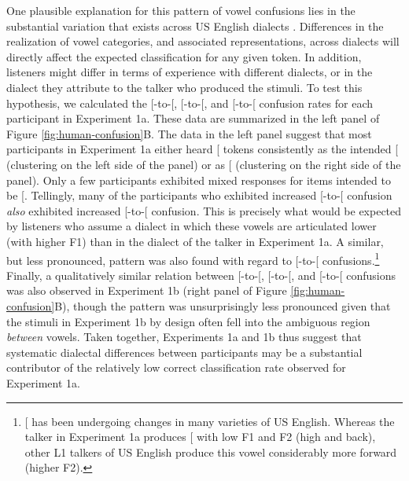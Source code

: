 \documentclass[preprint]{JASA}
\begin{document}
One plausible explanation for this pattern of vowel confusions lies in the substantial variation that exists across US English dialects \citep{atlasnae}. Differences in the realization of vowel categories, and associated representations, across dialects will directly affect the expected classification for any given token. In addition, listeners might differ in terms of experience with different dialects, or in the dialect they attribute to the talker who produced the stimuli. To test this hypothesis, we calculated the {[}\ipatext{ɪ}{]}-to-{[}\ipatext{ɛ}{]}, {[}\ipatext{ɛ}{]}-to-{[}\ipatext{æ}{]}, and {[}\ipatext{u}{]}-to-{[}\ipatext{ʊ}{]} confusion rates for each participant in Experiment 1a. These data are summarized in the left panel of Figure \ref{fig:human-confusion}B. The data in the left panel suggest that most participants in Experiment 1a either heard {[}\ipatext{ɪ}{]} tokens consistently as the intended {[}\ipatext{ɪ}{]} (clustering on the left side of the panel) or as {[}\ipatext{ɛ}{]} (clustering on the right side of the panel). Only a few participants exhibited mixed responses for items intended to be {[}\ipatext{ɪ}{]}. Tellingly, many of the participants who exhibited increased {[}\ipatext{ɪ}{]}-to-{[}\ipatext{ɛ}{]} confusion \emph{also} exhibited increased {[}\ipatext{ɛ}{]}-to-{[}\ipatext{æ}{]} confusion. This is precisely what would be expected by listeners who assume a dialect in which these vowels are articulated lower (with higher F1) than in the dialect of the talker in Experiment 1a. A similar, but less pronounced, pattern was also found with regard to {[}\ipatext{u}{]}-to-{[}\ipatext{ʊ}{]} confusions.\footnote{{[}\ipatext{u}{]} has been undergoing changes in many varieties of US English. Whereas the talker in Experiment 1a produces {[}\ipatext{u}{]} with low F1 and F2 (high and back), other L1 talkers of US English produce this vowel considerably more forward (higher F2).} Finally, a qualitatively similar relation between {[}\ipatext{ɪ}{]}-to-{[}\ipatext{ɛ}{]}, {[}\ipatext{ɛ}{]}-to-{[}\ipatext{æ}{]}, and {[}\ipatext{u}{]}-to-{[}\ipatext{ʊ}{]} confusions was also observed in Experiment 1b (right panel of Figure \ref{fig:human-confusion}B), though the pattern was unsurprisingly less pronounced given that the stimuli in Experiment 1b by design often fell into the ambiguous region \emph{between} vowels. Taken together, Experiments 1a and 1b thus suggest that systematic dialectal differences between participants may be a substantial contributor of the relatively low correct classification rate observed for Experiment 1a.
\end{document}
